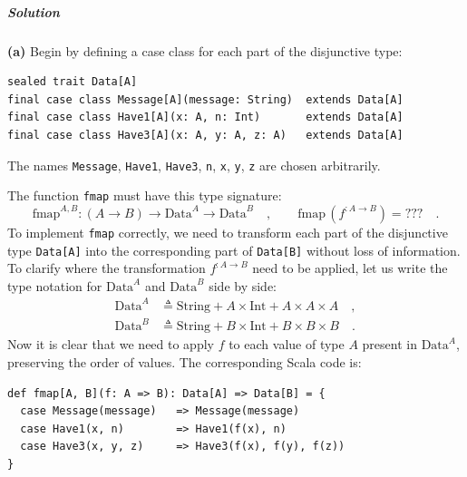 \subparagraph{Solution}

\textbf{(a)} Begin by defining a case class for each part of the disjunctive
type:
\begin{lstlisting}
sealed trait Data[A] 
final case class Message[A](message: String)  extends Data[A]
final case class Have1[A](x: A, n: Int)       extends Data[A]  
final case class Have3[A](x: A, y: A, z: A)   extends Data[A]
\end{lstlisting}
The names \lstinline!Message!, \lstinline!Have1!, \lstinline!Have3!,
\lstinline!n!, \lstinline!x!, \lstinline!y!, \lstinline!z! are
chosen arbitrarily. 

The function \lstinline!fmap! must have this type signature:
\[
\text{fmap}^{A,B}:\left(A\rightarrow B\right)\rightarrow\text{Data}^{A}\rightarrow\text{Data}^{B}\quad,\quad\quad\text{fmap}\,(f^{:A\rightarrow B})=\text{???}\quad.
\]
To implement \lstinline!fmap! correctly, we need to transform each
part of the disjunctive type \lstinline!Data[A]! into the corresponding
part of \lstinline!Data[B]! without loss of information. To clarify
where the transformation $f^{:A\rightarrow B}$ need to be applied,
let us write the type notation for $\text{Data}^{A}$ and $\text{Data}^{B}$
side by side:
\begin{align*}
\text{Data}^{A} & \triangleq\text{String}+A\times\text{Int}+A\times A\times A\quad,\\
\text{Data}^{B} & \triangleq\text{String}+B\times\text{Int}+B\times B\times B\quad.
\end{align*}
Now it is clear that we need to apply $f$ to each value of type $A$
present in $\text{Data}^{A}$, preserving the order of values. The
corresponding Scala code is:
\begin{lstlisting}
def fmap[A, B](f: A => B): Data[A] => Data[B] = {
  case Message(message)   => Message(message)
  case Have1(x, n)        => Have1(f(x), n)
  case Have3(x, y, z)     => Have3(f(x), f(y), f(z))
}
\end{lstlisting}


